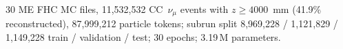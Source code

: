 30 ME FHC MC files, 11{,}532{,}532 CC~$\nu_\mu$ events with $z \ge 4000$~mm (41.9\% reconstructed), 87{,}999{,}212 particle tokens; subrun split 8{,}969{,}228 / 1{,}121{,}829 / 1{,}149{,}228 train / validation / test; 30 epochs; 3.19\,M parameters.
